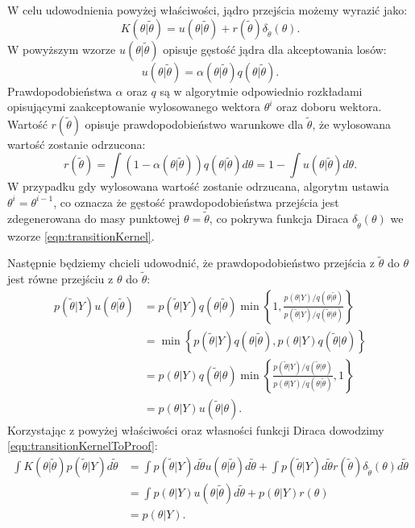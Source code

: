 W celu udowodnienia powyżej właściwości, jądro przejścia możemy wyrazić jako:
\begin{equation}
\label{eqn:transitionKernel}
    K(\theta|\widetilde{\theta}) = u(\theta|\widetilde{\theta}) + r(\widetilde{\theta})\delta_{\widetilde{\theta}}(\theta).
\end{equation}
W powyższym wzorze $u(\theta|\widetilde{\theta})$ opisuje gęstość jądra dla akceptowania losów:
\begin{equation}
    u(\theta|\widetilde{\theta}) = \alpha(\theta|\widetilde{\theta})q(\theta|\widetilde{\theta}).
\end{equation}
Prawdopodobieństwa $\alpha$ oraz $q$ są w algorytmie odpowiednio rozkładami opisującymi zaakceptowanie wylosowanego wektora $\theta^i$ oraz doboru wektora. Wartość $r(\widetilde{\theta})$ opisuje prawdopodobieństwo warunkowe dla $\widetilde{\theta}$, że wylosowana wartość zostanie odrzucona:
\begin{equation}
    r(\widetilde{\theta}) = \int (1 - \alpha(\theta|\widetilde{\theta}))q(\theta|\widetilde{\theta})d\theta = 1 - \int u(\theta|\widetilde{\theta})d\theta.
\end{equation}
W przypadku gdy wylosowana wartość zostanie odrzucana, algorytm ustawia $\theta^i = \theta^{i-1}$, co oznacza że gęstość prawdopodobieństwa przejścia jest zdegenerowana do masy punktowej $\theta = \widetilde{\theta}$, co pokrywa funkcja Diraca $\delta_{\widetilde{\theta}}(\theta)$ we wzorze \eqref{eqn:transitionKernel}.

Następnie będziemy chcieli udowodnić, że prawdopodobieństwo przejścia z $\widetilde{\theta}$ do $\theta$ jest równe przejściu z $\theta$ do $\widetilde{\theta}$:
\begin{align}
    p(\widetilde{\theta}|Y)u(\theta|\widetilde{\theta}) &= p(\widetilde{\theta}|Y)q(\theta|\widetilde{\theta})\min\left\{1, \frac{p(\theta|Y)/q(\theta|\widetilde{\theta})}{p(\widetilde{\theta}|Y)/q(\widetilde{\theta}|\theta)}\right\} \\
    &= \min\left\{p(\widetilde{\theta}|Y)q(\theta|\widetilde{\theta}),p(\theta|Y)q(\widetilde{\theta}|\theta)\right\} 
    \\&= p(\theta|Y)q(\widetilde{\theta}|\theta)\min\left\{\frac{p(\widetilde{\theta}|Y)/q(\widetilde{\theta}|\theta)}{p(\theta|Y)/q(\theta|\widetilde{\theta})}, 1\right\} 
    \\&= p(\theta|Y)u(\widetilde{\theta}|\theta).
\end{align}
Korzystając z powyżej właściwości oraz własności funkcji Diraca dowodzimy \eqref{eqn:transitionKernelToProof}:
\begin{align}
    \int K(\theta|\widetilde{\theta})p(\widetilde{\theta}|Y)d\widetilde{\theta} &= 
    \int p(\widetilde{\theta}|Y)d\widetilde{\theta} u(\theta|\widetilde{\theta}) d\widetilde{\theta} + 
    \int p(\widetilde{\theta}|Y)d\widetilde{\theta} r(\widetilde{\theta})\delta_{\widetilde{\theta}}(\theta) d\widetilde{\theta} \\
    &= \int p(\theta|Y) u(\theta|\widetilde{\theta}) d\widetilde{\theta} + p(\theta|Y)r(\theta) \\
    &= p(\theta|Y).
\end{align}

